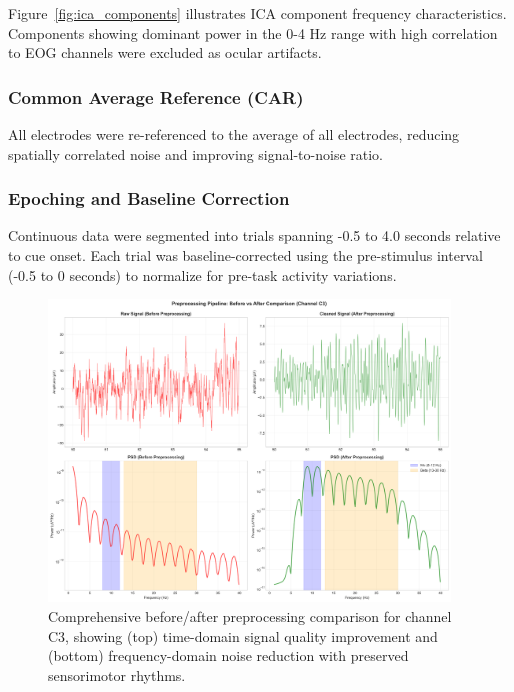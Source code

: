 \documentclass[11pt]{article}
\begin{document}
Figure~\ref{fig:ica_components} illustrates ICA component frequency characteristics. Components showing dominant power in the 0-4 Hz range with high correlation to EOG channels were excluded as ocular artifacts.

\subsubsection{Common Average Reference (CAR)}

All electrodes were re-referenced to the average of all electrodes, reducing spatially correlated noise and improving signal-to-noise ratio.

\subsubsection{Epoching and Baseline Correction}

Continuous data were segmented into trials spanning -0.5 to 4.0 seconds relative to cue onset. Each trial was baseline-corrected using the pre-stimulus interval (-0.5 to 0 seconds) to normalize for pre-task activity variations.

\begin{figure}[H]
    \centering
    \includegraphics[width=0.95\textwidth]{../results/figures/02_comprehensive_comparison.png}
    \caption{Comprehensive before/after preprocessing comparison for channel C3, showing (top) time-domain signal quality improvement and (bottom) frequency-domain noise reduction with preserved sensorimotor rhythms.}
    \label{fig:preprocessing_comparison}
\end{figure}
\end{document}
